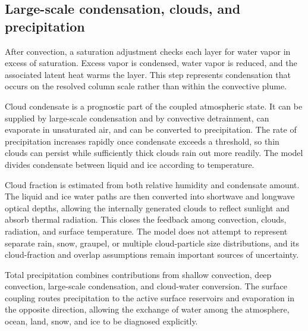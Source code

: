 \subsection{Large-scale condensation, clouds, and precipitation}

After convection, a saturation adjustment checks each layer for water vapor in excess of saturation.  Excess vapor is condensed, water vapor is reduced, and the associated latent heat warms the layer.  This step represents condensation that occurs on the resolved column scale rather than within the convective plume.

Cloud condensate is a prognostic part of the coupled atmospheric state.  It can be supplied by large-scale condensation and by convective detrainment, can evaporate in unsaturated air, and can be converted to precipitation.  The rate of precipitation increases rapidly once condensate exceeds a threshold, so thin clouds can persist while sufficiently thick clouds rain out more readily. The model divides condensate between liquid and ice according to temperature.

Cloud fraction is estimated from both relative humidity and condensate amount. The liquid and ice water paths are then converted into shortwave and longwave optical depths, allowing the internally generated clouds to reflect sunlight and absorb thermal radiation.  This closes the feedback among convection, clouds, radiation, and surface temperature.  The model does not attempt to represent separate rain, snow, graupel, or multiple cloud-particle size distributions, and its cloud-fraction and overlap assumptions remain important sources of uncertainty.

Total precipitation combines contributions from shallow convection, deep convection, large-scale condensation, and cloud-water conversion.  The surface coupling routes precipitation to the active surface reservoirs and evaporation in the opposite direction, allowing the exchange of water among the atmosphere, ocean, land, snow, and ice to be diagnosed explicitly.
